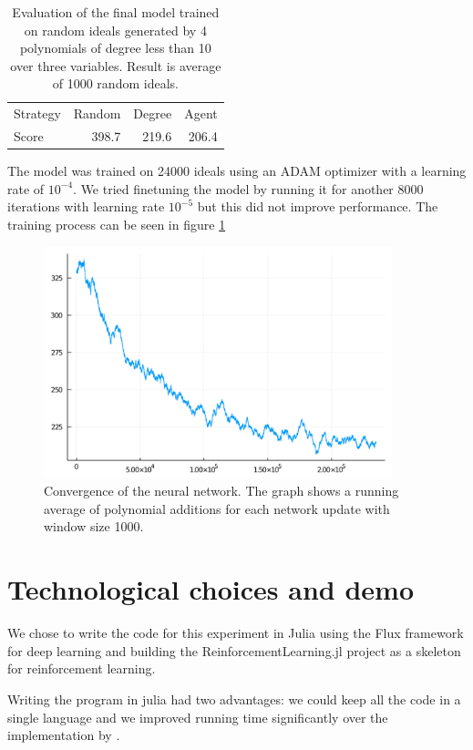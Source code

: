 \documentclass{article}
\theoremstyle{changedot}
\theoremstyle{changedotbreak}
\theoremstyle{nonumberplain}
\begin{document}
\begin{table}
  \centering
  \begin{tabular}{l|rrr}
    Strategy & Random & Degree & Agent \\
    Score    &  398.7 &  219.6 & 206.4
  \end{tabular}
  \caption{Evaluation of the final model trained on random ideals generated by 4 polynomials of degree less than 10 over three variables. Result is average of 1000 random ideals.}
  \label{tab:eval}
\end{table}

The model was trained on 24000 ideals using an ADAM optimizer with a learning rate of $10^{-4}$. We tried finetuning the model by running it for another 8000 iterations with learning rate $10^{-5}$ but this did not improve performance. The training process can be seen in figure \ref{fig:convergence}

\begin{figure}[h]
  \includegraphics[width=0.9\textwidth]{full_24k_En4_2layer.png}
  \caption{Convergence of the neural network. The graph shows a running average of polynomial additions for each network update with window size 1000.}
  \label{fig:convergence}
\end{figure}


\section{Technological choices and demo}
We chose to write the code for this experiment in Julia using the Flux framework for deep learning and building the ReinforcementLearning.jl project as a skeleton for reinforcement learning.

Writing the program in julia had two advantages: we could keep all the code in a single language and we improved running time significantly over the implementation by \cite{peifer}.
\end{document}
